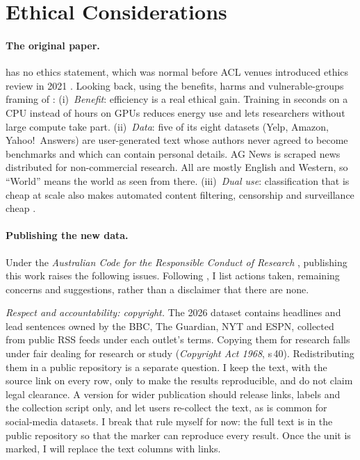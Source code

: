 \documentclass[11pt]{article}
\begin{document}
\section{Ethical Considerations}

\paragraph{The original paper.} \citet{joulin-etal-2017-bag} has no ethics statement, which
was normal before ACL venues introduced ethics review in 2021
\citep{benotti-blackburn-2022-ethics}. Looking back, using the benefits, harms and
vulnerable-groups framing of \citeauthor{benotti-blackburn-2022-ethics}:
(i)~\emph{Benefit}: efficiency is a real ethical gain. Training in seconds on a CPU instead of
hours on GPUs reduces energy use \citep{strubell-etal-2019-energy} and lets researchers
without large compute take part.
(ii)~\emph{Data}: five of its eight datasets (Yelp, Amazon, Yahoo!~Answers) are
user-generated text whose authors never agreed to become benchmarks and which can contain
personal details. AG News is scraped news distributed for non-commercial research. All are
mostly English and Western, so ``World'' means the world as seen from there.
(iii)~\emph{Dual use}: classification that is cheap at scale also makes automated content
filtering, censorship and surveillance cheap \citep{weidinger2021ethical}.

\paragraph{Publishing the new data.} Under the \emph{Australian Code for the Responsible
Conduct of Research} \citep{nhmrc2018code}, publishing this work raises the following issues.
Following \citet{karamolegkou-etal-2025-ethical}, I list actions taken, remaining concerns
and suggestions, rather than a disclaimer that there are none.

\emph{Respect and accountability: copyright.} The 2026 dataset contains headlines and lead
sentences owned by the BBC, The Guardian, NYT and ESPN, collected from public RSS feeds under
each outlet's terms. Copying them for research falls under fair dealing for research or
study (\emph{Copyright Act 1968}, s\,40). Redistributing them in a public repository is a
separate question. I keep the text, with the source link on every row, only to make the
results reproducible, and do not claim legal clearance. A version for wider publication
should release links, labels and the collection script only, and let users re-collect the
text, as is common for social-media datasets. I break that rule myself for now: the full text
is in the public repository so that the marker can reproduce every result. Once the unit is
marked, I will replace the text columns with links.
\end{document}
